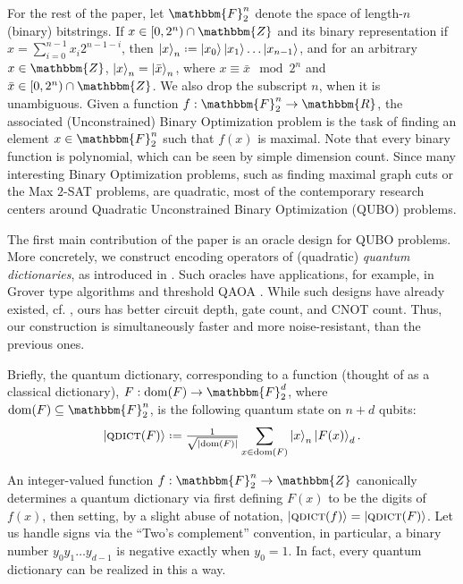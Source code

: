 \documentclass[reqno, 12pt]{amsart}
\numberwithin{equation}{section}                %
\let\originalleft\left
\let\originalright\right
\renewcommand{\left}{\mathopen{}\mathclose\bgroup\originalleft}
\renewcommand{\right}{\aftergroup\egroup\originalright}
\def\({\mathopen{}\left(}
\def\){\right)\mathclose{}}
\newcommand*{\eqdef}{\mathrel{\vcenter{\baselineskip0.5ex \lineskiplimit0pt\hbox{.}\hbox{.}}}=}
\def\F{\mathbbm{F}}
\def\rl{\mathbbm{R}}
\def\Z{\mathbbm{Z}}
\def\dom{\mathrm{dom}}
\def\qdict{\textsc{qdict}}
\begin{document}
For the rest of the paper, let $\F_2^n$ denote the space of length-$n$ (binary) bitstrings. If $x \in \left[ 0, 2^n \) \cap \Z$ and its binary representation if $x = \sum_{i = 0}^{n - 1} x_i 2^{n - 1 - i}$, then $\ket{x}_n \eqdef \ket{x_0} \ket{x_1} \ldots \ket{x_{n - 1}}$, and for an arbitrary $x \in \Z$, $\ket{x}_n = \ket{\bar{x}}_n$, where $x \equiv \bar{x} \!\! \mod 2^n$ and $\bar{x} \in \left[ 0, 2^n \) \cap \Z$. We also drop the subscript $n$, when it is unambiguous. Given a function $f : \F_2^n \rightarrow \rl$, the associated (Unconstrained) Binary Optimization problem is the task of finding an element $x \in \F_2^n$ such that $f (x)$ is maximal. Note that every binary function is polynomial, which can be seen by simple dimension count. Since many interesting Binary Optimization problems, such as finding maximal graph cuts or the Max $2$-SAT problems, are quadratic, most of the contemporary research centers around Quadratic Unconstrained  Binary Optimization (QUBO) problems.

\medskip

The first main contribution of the paper is an oracle design for QUBO problems. More concretely, we construct encoding operators of (quadratic) \emph{quantum dictionaries}, as introduced in \cite{gilliam_foundational_2021}. Such oracles have applications, for example, in Grover type algorithms and threshold QAOA \cite{golden_threshold_2021}. While such designs have already existed, cf. \cite{gilliam_grover_2021}, ours has better circuit depth, gate count, and CNOT count. Thus, our construction is simultaneously faster and more noise-resistant, than the previous ones.

Briefly, the quantum dictionary, corresponding to a function (thought of as a classical dictionary), $F: \dom \( F \) \rightarrow \F_2^d$, where $\dom \( F \) \subseteq \F_2^n$, is the following quantum state on $n + d$ qubits:
\begin{equation}
   \ket{\qdict \( F \)} \eqdef \tfrac{1}{\sqrt{\left| \dom \( F \) \right|}} \sum\limits_{x \in \dom \( F \)} \ket{x}_n \ket{F (x)}_d.
\end{equation}

An integer-valued function $f : \F_2^n \rightarrow \Z$ canonically determines a quantum dictionary via first defining $F (x)$ to be the digits of $f (x)$, then setting, by a slight abuse of notation, $\ket{\qdict \( f \)} = \ket{\qdict \( F \)}$. Let us handle signs via the ``Two's complement'' convention, in particular, a binary number $y_0 y_1 \ldots y_{d - 1}$ is negative exactly when $y_0 = 1$. In fact, every quantum dictionary can be realized in this a way.
\end{document}
